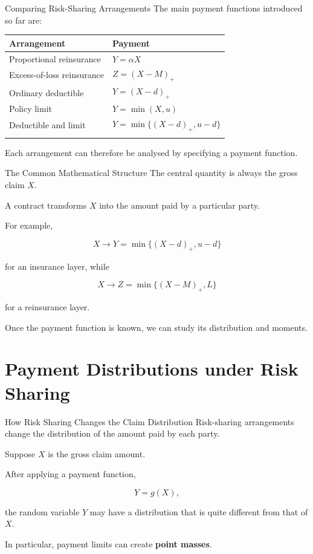 \documentclass[
  ignorenonframetext,
  aspectratio=169,
]{beamer}
\newcounter{none} %
\begin{document}
\begin{frame}{Comparing Risk-Sharing Arrangements}
\protect{}\label{comparing-risk-sharing-arrangements}
The main payment functions introduced so far are:

{\def\LTcaptype{none} %
\begin{longtable}[]{@{}ll@{}}
\toprule\noalign{}
Arrangement & Payment \\
\midrule\noalign{}
\endhead
Proportional reinsurance & \(Y=\alpha X\) \\
Excess-of-loss reinsurance & \(Z=(X-M)_+\) \\
Ordinary deductible & \(Y=(X-d)_+\) \\
Policy limit & \(Y=\min(X,u)\) \\
Deductible and limit & \(Y=\min\{(X-d)_+,u-d\}\) \\
\bottomrule\noalign{}
\end{longtable}
}

Each arrangement can therefore be analysed by specifying a payment
function.
\end{frame}

\begin{frame}{The Common Mathematical Structure}
\protect{}\label{the-common-mathematical-structure}
The central quantity is always the gross claim \(X\).

A contract transforms \(X\) into the amount paid by a particular party.

For example,

\[
X
\longrightarrow
Y=\min\{(X-d)_+,u-d\}
\]

for an insurance layer, while

\[
X
\longrightarrow
Z=\min\{(X-M)_+,L\}
\]

for a reinsurance layer.

Once the payment function is known, we can study its distribution and
moments.
\end{frame}

\begin{frame}
\end{frame}

\section{Payment Distributions under Risk
Sharing}\label{payment-distributions-under-risk-sharing}

\begin{frame}{How Risk Sharing Changes the Claim Distribution}
\protect{}\label{how-risk-sharing-changes-the-claim-distribution}
Risk-sharing arrangements change the distribution of the amount paid by
each party.

Suppose \(X\) is the gross claim amount.

After applying a payment function,

\[
Y=g(X),
\]

the random variable \(Y\) may have a distribution that is quite
different from that of \(X\).

In particular, payment limits can create \textbf{point masses}.
\end{frame}
\end{document}
